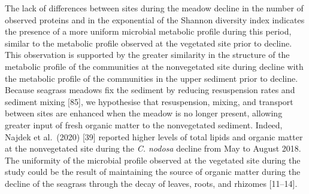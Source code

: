 \documentclass[
  12 pt,
]{article}
\begin{document}
The lack of differences between sites during the meadow decline in the number of observed proteins and in the exponential of the Shannon diversity index indicates the presence of a more uniform microbial metabolic profile during this period, similar to the metabolic profile observed at the vegetated site prior to decline. This observation is supported by the greater similarity in the structure of the metabolic profile of the communities at the nonvegetated site during decline with the metabolic profile of the communities in the upper sediment prior to decline. Because seagrass meadows fix the sediment by reducing resuspension rates and sediment mixing {[}85{]}, we hypothesise that resuspension, mixing, and transport between sites are enhanced when the meadow is no longer present, allowing greater input of fresh organic matter to the nonvegetated sediment. Indeed, Najdek et al.~(2020) {[}39{]} reported higher levels of total lipids and organic matter at the nonvegetated site during the \emph{C. nodosa} decline from May to August 2018. The uniformity of the microbial profile observed at the vegetated site during the study could be the result of maintaining the source of organic matter during the decline of the seagrass through the decay of leaves, roots, and rhizomes {[}11--14{]}.
\end{document}
